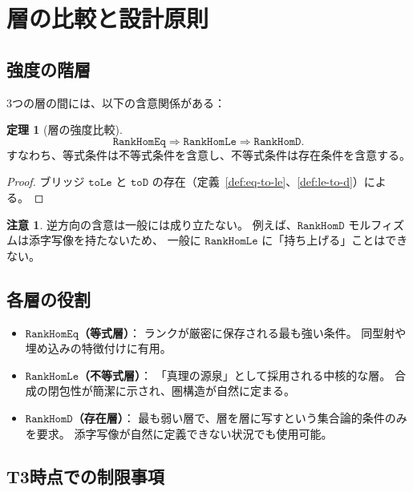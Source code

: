 \documentclass[11pt,a4paper,ja=standard]{bxjsarticle}
\theoremstyle{definition}
\newtheorem{theorem}[definition]{定理}
\newtheorem{remark}[definition]{注意}
\newcommand{\RankHomLe}{\mathtt{RankHomLe}}
\newcommand{\RankHomEq}{\mathtt{RankHomEq}}
\newcommand{\RankHomD}{\mathtt{RankHomD}}
\begin{document}
\section{層の比較と設計原則}

\subsection{強度の階層}

3つの層の間には、以下の含意関係がある：

\begin{theorem}[層の強度比較]
\[
  \RankHomEq \Rightarrow \RankHomLe \Rightarrow \RankHomD.
\]
すなわち、等式条件は不等式条件を含意し、不等式条件は存在条件を含意する。
\end{theorem}

\begin{proof}
ブリッジ $\mathtt{toLe}$ と $\mathtt{toD}$ の存在（定義~\ref{def:eq-to-le}、\ref{def:le-to-d}）による。
\end{proof}

\begin{remark}
逆方向の含意は一般には成り立たない。
例えば、$\RankHomD$ モルフィズムは添字写像を持たないため、
一般に $\RankHomLe$ に「持ち上げる」ことはできない。
\end{remark}

\subsection{各層の役割}

\begin{itemize}
\item \textbf{$\RankHomEq$（等式層）}：
ランクが厳密に保存される最も強い条件。
同型射や埋め込みの特徴付けに有用。

\item \textbf{$\RankHomLe$（不等式層）}：
「真理の源泉」として採用される中核的な層。
合成の閉包性が簡潔に示され、圏構造が自然に定まる。

\item \textbf{$\RankHomD$（存在層）}：
最も弱い層で、層を層に写すという集合論的条件のみを要求。
添字写像が自然に定義できない状況でも使用可能。
\end{itemize}

\subsection{T3時点での制限事項}
\end{document}
